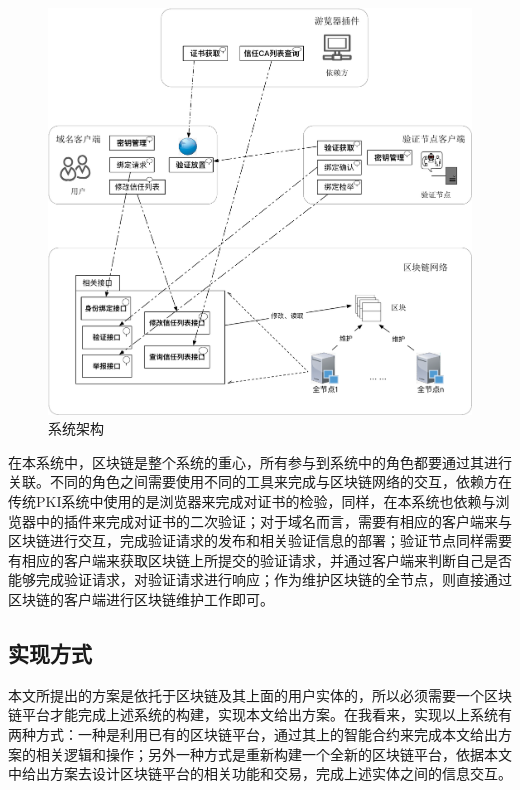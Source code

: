 \begin{figure}[!htbp]
 	\centering
 	\includegraphics[width=1 \textwidth]{img/framework}
 	\caption{系统架构}\label{fig:framework}
\end{figure}



在本系统中，区块链是整个系统的重心，所有参与到系统中的角色都要通过其进行关联。不同的角色之间需要使用不同的工具来完成与区块链网络的交互，依赖方在传统PKI系统中使用的是浏览器来完成对证书的检验，同样，在本系统也依赖与浏览器中的插件来完成对证书的二次验证；对于域名而言，需要有相应的客户端来与区块链进行交互，完成验证请求的发布和相关验证信息的部署；验证节点同样需要有相应的客户端来获取区块链上所提交的验证请求，并通过客户端来判断自己是否能够完成验证请求，对验证请求进行响应；作为维护区块链的全节点，则直接通过区块链的客户端进行区块链维护工作即可。

\subsection{实现方式}

本文所提出的方案是依托于区块链及其上面的用户实体的，所以必须需要一个区块链平台才能完成上述系统的构建，实现本文给出方案。在我看来，实现以上系统有两种方式：一种是利用已有的区块链平台，通过其上的智能合约来完成本文给出方案的相关逻辑和操作；另外一种方式是重新构建一个全新的区块链平台，依据本文中给出方案去设计区块链平台的相关功能和交易，完成上述实体之间的信息交互。

